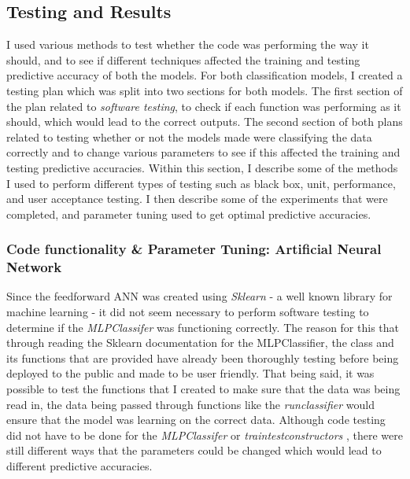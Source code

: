 \documentclass[11pt]{article}
\begin{document}
\subsection{Testing and Results}
I used various methods to test whether the code was performing the way it should, and to see if different techniques affected the training and testing predictive accuracy of both the models. For both classification models, I created a testing plan which was split into two sections for both models. The first section of the plan related to \textit{software testing}, to check if each function was performing as it should, which would lead to the correct outputs. The second section of both plans related to testing whether or not the models made were classifying the data correctly and to change various parameters to see if this affected the training and testing predictive accuracies. Within this section, I describe some of the methods I used to perform different types of testing such as black box, unit, performance, and user acceptance testing. I then describe some of the experiments that were completed, and parameter tuning used to get optimal predictive accuracies.  \\
\subsubsection{Code functionality \& Parameter Tuning: Artificial Neural Network}
Since the feedforward ANN was created using \textit{Sklearn} - a well known library for machine learning  - it did not seem necessary to perform software testing to determine if the \textit{MLPClassifer} was functioning correctly. The reason for this that through reading the Sklearn documentation for the MLPClassifier, the class and its functions that are provided have already been thoroughly testing before being deployed to the public and made to be user friendly. That being said, it was possible to test the functions that I created to make sure that the data was being read in, the data being passed through functions like the \textit{run\textunderscore classifier} would ensure that the model was learning on the correct data.
Although code testing did not have to be done for the \textit{MLPClassifer} or \textit{train\textunderscore test\textunderscore constructors} , there were still different ways that the parameters could be changed which would lead to different predictive accuracies. 
\end{document}
